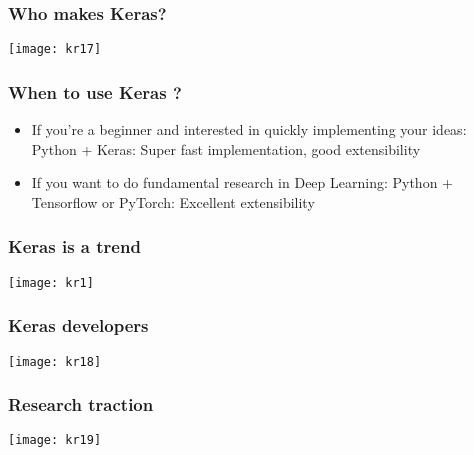 \begin{frame}[fragile] \frametitle{Who makes Keras?}

\begin{center}
\texttt{[image: kr17]}
\end{center}


\end{frame}

\begin{frame}[fragile] \frametitle{When to use Keras ?}

\begin{itemize}
\item  If you're a beginner 
and interested in 
quickly implementing 
your ideas:  Python + Keras: Super fast 
implementation, good 
extensibility
\item  If you want to do 
fundamental research 
in Deep Learning:  Python + Tensorflow or 
PyTorch: Excellent 
extensibility
\end{itemize}
\end{frame}



\begin{frame}[fragile] \frametitle{Keras is a trend}
\begin{center}
\texttt{[image: kr1]}
\end{center}

\end{frame}

\begin{frame}[fragile] \frametitle{Keras developers}
\begin{center}
\texttt{[image: kr18]}
\end{center}

\end{frame}

\begin{frame}[fragile] \frametitle{Research traction}
\begin{center}
\texttt{[image: kr19]}
\end{center}

\end{frame}

